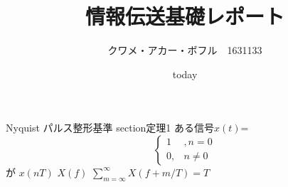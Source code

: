 \documentclass[24 pts]{article}
\title{情報伝送基礎レポート}
\date{today}
\author{クワメ・アカー・ボフル　1631133}
\begin{document}
\maketitle
Nyquist パルス整形基準
section{定理1}
ある信号$x(t)$=
\[
\begin{cases}
1&,n=0\\
0,&n\neq0
 \end{cases}
\]
が $x(nT)$ $X(f)$ $\sum_{m=\infty}^\infty X(f+m/T)=T$
\end{document}
